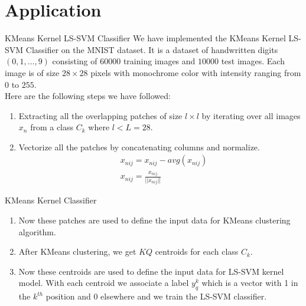 \documentclass{beamer}
\newcounter{saveenumi}
\newcommand{\seti}{\setcounter{saveenumi}{\value{enumi}}}
\newcommand{\conti}{\setcounter{enumi}{\value{saveenumi}}}
\begin{document}
    \section{Application}
    \begin{frame}{KMeans Kernel LS-SVM Classifier}
        We have implemented the KMeans Kernel LS-SVM Classifier on the MNIST dataset.
        It is a dataset of handwritten digits $(0,1,\ldots,9)$ consisting of $60000$ training images and $10000$ test images. Each image is of size $28 \times 28$ pixels with monochrome color with intensity ranging from $0$ to $255$. \\ \quad Here are the following steps we have followed: \\
        \begin{enumerate}
            \item Extracting all the overlapping patches of size $l \times l$ by iterating over all images $x_{n}$ from a class $C_{k}$ where $l<L=28$.
            \item Vectorize all the patches by concatenating columns and normalize.
            \begin{align*}
                & x_{nij} = x_{nij} - avg(x_{nij}) \\
                & x_{nij} = \frac{x_{nij}}{||x_{nij}||}
            \end{align*}
            \seti
        \end{enumerate}
    \end{frame}
    \begin{frame}{KMeans Kernel Classifier}
        \begin{enumerate}
            \conti
            \item Now these patches are used to define the input data for KMeans clustering algorithm.
            \item After KMeans clustering, we get $KQ$ centroids for each class $C_{k}$.
            \item Now these centroids are used to define the input data for LS-SVM kernel model. With each centroid we associate a label $y_{q}^{k}$ which is a vector with 1 in the $k^{th}$ position and $0$ elsewhere and we train the LS-SVM classifier.
        \end{enumerate}
    \end{frame}
\end{document}

